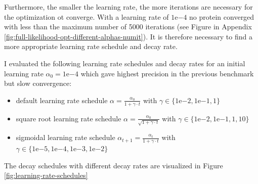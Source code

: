 \documentclass[12pt,a4paper,twoside]{book}
\providecommand{\tightlist}{%
  \setlength{\itemsep}{0pt}\setlength{\parskip}{0pt}}
\theoremstyle{definition}
\theoremstyle{definition}
\theoremstyle{remark}
\begin{document}
Furthermore, the smaller the learning rate, the more iterations are
necessary for the optimization ot converge. With a learning rate of
\(1\mathrm{e}{-4}\) no protein converged with less than the maximum
number of 5000 iterations (see Figure in Appendix
\ref{fig:full-likelihood-opt-different-alphas-numit}). It is therefore
necessary to find a more appropriate learning rate schedule and decay
rate.

I evaluated the following learning rate schedules and decay rates for an
initial learning rate \(\alpha_0 = 1\mathrm{e}{-4}\) which gave highest
precision in the previous benchmark but slow convergence:

\begin{itemize}
\tightlist
\item
  default learning rate schedule
  \(\alpha = \frac{\alpha_0}{1 + \gamma \cdot t}\) with
  \(\gamma \in \{1\mathrm{e}{-2}, 1\mathrm{e}{-1}, 1\}\)
\item
  square root learning rate schedule
  \(\alpha = \frac{\alpha_0}{\sqrt{1 + \gamma \cdot t}}\) with
  \(\gamma \in \{1\mathrm{e}{-2}, 1\mathrm{e}{-1}, 1, 10\}\)
\item
  sigmoidal learning rate schedule
  \(\alpha_{t+1} = \frac{\alpha_{t}}{1 + \gamma \cdot t}\) with
  \(\gamma \in \{1\mathrm{e}{-5}, 1\mathrm{e}{-4}, 1\mathrm{e}{-3}, 1\mathrm{e}{-2}\}\)
\end{itemize}

The decay schedules with different decay rates are visualized in Figure
\ref{fig:learning-rate-schedules}
\end{document}
